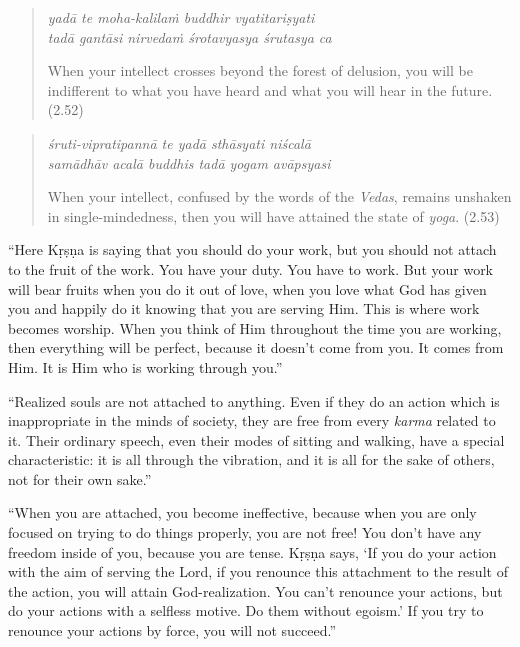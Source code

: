 \documentclass[12pt, twoside, openright]{memoir}
\begin{document}
\par
\begin{verse}
\textit{yadā te moha-kalilaṁ buddhir vyatitariṣyati} \\
\textit{tadā gantāsi nirvedaṁ śrotavyasya śrutasya ca}

\noindent When your intellect crosses beyond the forest of delusion, you will be indifferent to what you have heard and what you will hear in the future. (2.52)
\end{verse}
\par



\par
\begin{verse}
\textit{śruti-vipratipannā te yadā sthāsyati niścalā} \\
\textit{samādhāv acalā buddhis tadā yogam avāpsyasi}

\noindent When your intellect, confused by the words of the \textit{Vedas}, remains unshaken in single-mindedness, then you will have attained the state of \textit{yoga}. (2.53)
\end{verse}
\par


\enquote{Here Kṛṣṇa is saying that you should do your work, but you should not attach to the fruit of the work. You have your duty. You have to work. But your work will bear fruits when you do it out of love, when you love what God has given you and happily do it knowing that you are serving Him. This is where work becomes worship. When you think of Him throughout the time you are working, then everything will be perfect, because it doesn’t come from you. It comes from Him. It is Him who is working through you.}

\enquote{Realized souls are not attached to anything. Even if they do an action which is inappropriate in the minds of society, they are free from every \textit{karma} related to it. Their ordinary speech, even their modes of sitting and walking, have a special characteristic: it is all through the vibration, and it is all for the sake of others, not for their own sake.}

\enquote{When you are attached, you become ineffective, because when you are only focused on trying to do things properly, you are not free! You don’t have any freedom inside of you, because you are tense. Kṛṣṇa says, \enquote{If you do your action with the aim of serving the Lord, if you renounce this attachment to the result of the action, you will attain God-realization. You can’t renounce your actions, but do your actions with a selfless motive. Do them without egoism.} If you try to renounce your actions by force, you will not succeed.}
\end{document}
